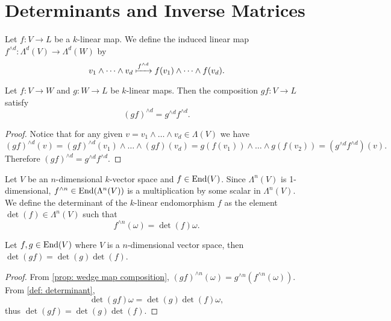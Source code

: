 \section{Determinants and Inverse Matrices}

\begin{definition}\label{def: wedge map}
  Let \(f: V \to L\) be a \(k\)-linear map. We define the induced linear map
  \(f^{\wedge d}: \Lambda^d(V) \to \Lambda^d(W)\) by
  \[
    v_1 \wedge \dots \wedge v_d \xmapsto{f^{\wedge d}}
    f(v_1) \wedge \dots \wedge f(v_d).
  \]
\end{definition}

\begin{proposition}\label{prop: wedge map composition}
  Let \(f: V \to W\) and \(g: W \to L\) be \(k\)-linear maps. Then the
  composition \(g f: V \to L\) satisfy
  \[
    (g f)^{\wedge d} = g^{\wedge d} f^{\wedge d}.
  \]
\end{proposition}

\begin{proof}
  Notice that for any given \(v = v_1 \wedge \dots \wedge v_d \in \Lambda(V)\)
  we have
  \[
    (g f)^{\wedge d}(v) = (g f)^{\wedge d}(v_1) \wedge \dots \wedge (g f)(v_d)
    = g(f(v_1)) \wedge \dots \wedge g(f(v_2))
    = (g^{\wedge d} f^{\wedge d})(v).
  \]
  Therefore \((g f)^{\wedge d} = g^{\wedge d} f^{\wedge d}\).
\end{proof}

\begin{definition}[Determinant]\label{def: determinant}
  Let \(V\) be an \(n\)-dimensional \(k\)-vector space and \(f \in \operatorname{End}(V)\).
  Since \(\Lambda^n(V)\) is 1-dimensional, \(f^{\wedge n} \in \operatorname{End}(\Lambda^n
  (V))\) is a multiplication by some scalar in \(\Lambda^n(V)\).  We define the
  determinant of the \(k\)-linear endomorphism \(f\) as the element \(\det(f)
  \in \Lambda^n(V)\) such that
  \[
    f^{\wedge n}(\omega) = \det(f) \omega.
  \]
\end{definition}

\begin{proposition}\label{prop: comp det}
  Let \(f, g \in \operatorname{End}(V)\) where \(V\) is a \(n\)-dimensional vector space, then
  \(\det(g f) = \det(g) \det(f)\).
\end{proposition}

\begin{proof}
  From \cref{prop: wedge map composition}, \((g f)^{\wedge n}(\omega) =
  g^{\wedge n}(f^{\wedge n}(\omega))\). From \cref{def: determinant},
  \[
  \det(g f) \omega = \det(g) \det(f) \omega,
  \]
  thus \(\det(g f) = \det(g) \det(f)\).
\end{proof}


